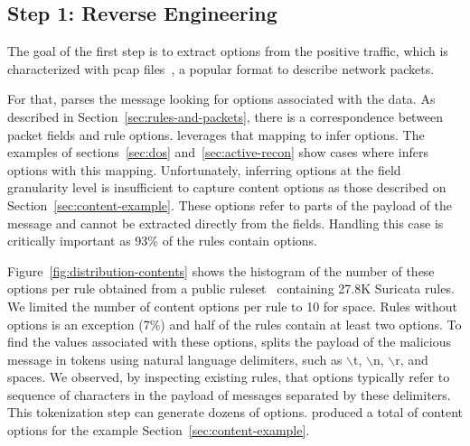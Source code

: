 \documentclass[sigconf,review, anonymous]{acmart}
\begin{document}
\subsection{Step 1: Reverse Engineering}

The goal of the first step is to extract options from the positive
traffic, which is characterized with pcap files~\cite{pcap}, a popular
format to describe network packets.

For that, \tname{} parses the message looking for options associated
with the data. As described in Section~\ref{sec:rules-and-packets},
there is a correspondence between packet fields and rule
options. \tname{} leverages that mapping to infer options. The
examples of sections~\ref{sec:dos} and~\ref{sec:active-recon} show
cases where \tname{} infers options with this mapping. Unfortunately,
inferring options at the field granularity level is insufficient to
capture content options as those described on
Section~\ref{sec:content-example}. These options refer to parts of the
payload of the message and cannot be extracted directly from the
fields. Handling this case is critically important as 93\% of the
rules contain  options.


Figure~\ref{fig:distribution-contents} shows the histogram of the
number of these options per rule obtained from a public
ruleset~\cite{emerging-threats-open} containing 27.8K Suricata
rules. We limited the number of content options per rule to 10 for
space. Rules without  options is an exception
(7\%) and half of the rules contain at least two
 options.  To find the values associated with these
options, \tname{} splits the payload of the malicious message in
tokens using natural language delimiters, such as $\backslash$t,
$\backslash$n, $\backslash$r, and spaces. We observed, by inspecting
existing rules, that  options typically refer to
sequence of characters in the payload of messages separated by these
delimiters. This tokenization step can generate dozens of options.
\tname{} produced a total of  content options for the example
Section~\ref{sec:content-example}.


\end{document}
